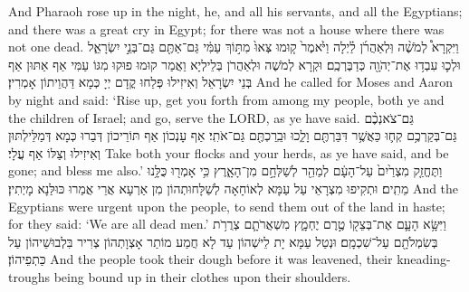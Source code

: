 {{And Pharaoh rose up in the night, he, and all his servants, and all the Egyptians; and there was a great cry in Egypt; for there was not a house where there was not one dead.}{}
{וַיִּקְרָא֩ לְמֹשֶׁ֨ה וּֽלְאַהֲרֹ֜ן לַ֗יְלָה וַיֹּ֙אמֶר֙ ק֤וּמוּ צְּאוּ֙ מִתּ֣וֹךְ עַמִּ֔י גַּם־אַתֶּ֖ם גַּם־בְּנֵ֣י יִשְׂרָאֵ֑ל וּלְכ֛וּ עִבְד֥וּ אֶת־יְהֹוָ֖ה כְּדַבֶּרְכֶֽם׃
}
{וּקְרָא לְמֹשֶׁה וּלְאַהֲרֹן בְּלֵילְיָא וַאֲמַר קוּמוּ פוּקוּ מִגּוֹ עַמִּי אַף אַתּוּן אַף בְּנֵי יִשְׂרָאֵל וְאִיזִילוּ פְּלַחוּ קֳדָם יְיָ כְּמָא דַּהֲוֵיתוֹן אָמְרִין׃}
{And he called for Moses and Aaron by night and said: ‘Rise up, get you forth from among my people, both ye and the children of Israel; and go, serve the LORD, as ye have said.}{}
{גַּם־צֹאנְכֶ֨ם גַּם־בְּקַרְכֶ֥ם קְח֛וּ כַּאֲשֶׁ֥ר דִּבַּרְתֶּ֖ם וָלֵ֑כוּ וּבֵֽרַכְתֶּ֖ם גַּם־אֹתִֽי׃
}
{אַף עָנְכוֹן אַף תּוֹרֵיכוֹן דְּבַרוּ כְּמָא דְּמַלֵּילְתּוּן וְאִיזִילוּ וְצַלּוֹ אַף עֲלָי׃}
{Take both your flocks and your herds, as ye have said, and be gone; and bless me also.’}{}
{וַתֶּחֱזַ֤ק מִצְרַ֙יִם֙ עַל־הָעָ֔ם לְמַהֵ֖ר לְשַׁלְּחָ֣ם מִן־הָאָ֑רֶץ כִּ֥י אָמְר֖וּ כֻּלָּ֥נוּ מֵתִֽים׃
}
{וּתְקִיפוּ מִצְרָאֵי עַל עַמָּא לְאוֹחָאָה לְשַׁלָּחוּתְהוֹן מִן אַרְעָא אֲרֵי אֲמַרוּ כּוּלַּנָא מָיְתִין׃}
{And the Egyptians were urgent upon the people, to send them out of the land in haste; for they said: ‘We are all dead men.’}{}
{וַיִּשָּׂ֥א הָעָ֛ם אֶת־בְּצֵק֖וֹ טֶ֣רֶם יֶחְמָ֑ץ מִשְׁאֲרֹתָ֛ם צְרֻרֹ֥ת בְּשִׂמְלֹתָ֖ם עַל־שִׁכְמָֽם׃
}
{וּנְטַל עַמָּא יָת לֵישְׁהוֹן עַד לָא חֲמַע מוֹתַר אָצְוָתְהוֹן צְרִיר בִּלְבוּשֵׁיהוֹן עַל כַּתְפֵיהוֹן׃}
{And the people took their dough before it was leavened, their kneading-troughs being bound up in their clothes upon their shoulders.}{}
}
